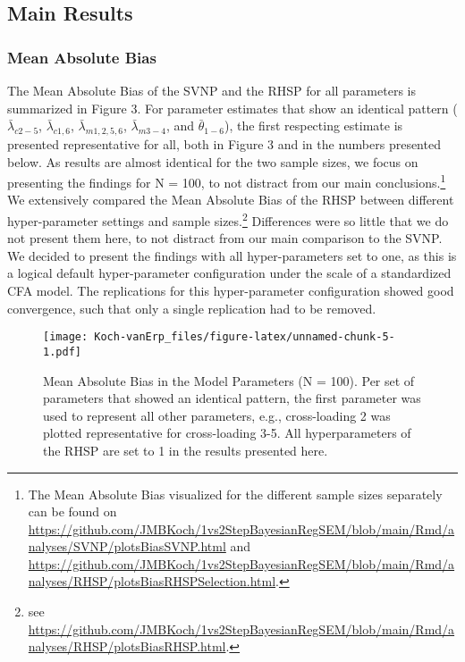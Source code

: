 \documentclass[]{interact}
\theoremstyle{plain}%
\theoremstyle{definition}
\theoremstyle{remark}
\begin{document}
\hypertarget{main-results}{%
\subsection{Main Results}\label{main-results}}

\hypertarget{mean-absolute-bias-1}{%
\subsubsection{Mean Absolute Bias}\label{mean-absolute-bias-1}}

The Mean Absolute Bias of the SVNP and the RHSP for all parameters is
summarized in Figure 3. For parameter estimates that show an identical
pattern (\(\bar{\lambda}_{c 2-5}\), \(\bar{\lambda}_{c 1, 6}\),
\(\bar{\lambda}_{m 1, 2, 5, 6}\), \(\bar{\lambda}_{m 3-4}\), and
\(\bar{\theta}_{1-6}\)), the first respecting estimate is presented
representative for all, both in Figure 3 and in the numbers presented
below. As results are almost identical for the two sample sizes, we
focus on presenting the findings for N = 100, to not distract from our
main conclusions.\footnote{The Mean Absolute Bias visualized for the
  different sample sizes separately can be found on
  \url{https://github.com/JMBKoch/1vs2StepBayesianRegSEM/blob/main/Rmd/analyses/SVNP/plotsBiasSVNP.html}
  and
  \url{https://github.com/JMBKoch/1vs2StepBayesianRegSEM/blob/main/Rmd/analyses/RHSP/plotsBiasRHSPSelection.html}.}
We extensively compared the Mean Absolute Bias of the RHSP between
different hyper-parameter settings and sample sizes.\footnote{see
  \url{https://github.com/JMBKoch/1vs2StepBayesianRegSEM/blob/main/Rmd/analyses/RHSP/plotsBiasRHSP.html}.}
Differences were so little that we do not present them here, to not
distract from our main comparison to the SVNP. We decided to present the
findings with all hyper-parameters set to one, as this is a logical
default hyper-parameter configuration under the scale of a standardized
CFA model. The replications for this hyper-parameter configuration
showed good convergence, such that only a single replication had to be
removed.

\begin{figure}
\centering
\texttt{[image: Koch-vanErp\_files/figure-latex/unnamed-chunk-5-1.pdf]}
\caption{Mean Absolute Bias in the Model Parameters (N = 100). Per set
of parameters that showed an identical pattern, the first parameter was
used to represent all other parameters, e.g., cross-loading 2 was
plotted representative for cross-loading 3-5. All hyperparameters of the
RHSP are set to 1 in the results presented here.}
\end{figure}
\end{document}
